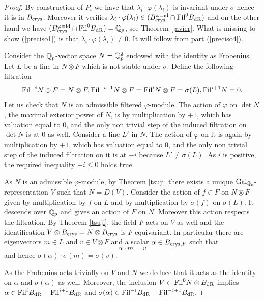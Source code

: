 \documentclass[11pt]{amsart}
\begin{document}
\begin{proof}
By construction of $P_i$ we have that $\lambda_i \cdot\varphi(\lambda_i) $ is invariant under $\sigma$ hence it is in $B_{\textnormal{crys}}$. Moreover it verifies  $ \lambda_i \cdot\varphi(\lambda_i) \in (B_{\textnormal{crys}}^{\varphi=\mathrm{id}} \cap \textnormal{Fil}^0B_{\mathrm{dR}})$  and on the other hand we have  $(B_{\textnormal{crys}}^{\varphi=\mathrm{id}} \cap \textnormal{Fil}^0B_{\mathrm{dR}})=\mathbb{Q}_p$, see Theorem \ref{javier}. What is missing to show (\ref{preciso1}) is that $\lambda_i \cdot\varphi(\lambda_i)\neq 0.$ It will follow from part (\ref{preciso4}).

 Consider the $\mathbb{Q}_p$-vector space $N=\mathbb{Q}_p^2$ endowed with the identity as Frobenius. Let $L$ be a line in $N\otimes F$ which is not stable under $\sigma$.
Define the following filtration
\[\textnormal{Fil}^{-i}N\otimes F=N\otimes F, \textnormal{Fil}^{-i+1}N\otimes F =\textnormal{Fil}^i N \otimes F=\sigma(L), \textnormal{Fil}^{i+1} N=0.  \]
Let us  check that $N$ is an admissible filtered $\varphi$-module.  The action of $\varphi$ on $\det N$, the maximal exterior power of $N$, is by multiplication by $+1$, which has valuation equal to $0$, and the only non trivial step of the induced filtration on $\det N$ is at $0$ as well. Consider a line $L'$ in $N$. The action of $\varphi$ on it is again by multiplication by $+ 1$, which has valuation equal to $0$, and the only non trivial step of the induced filtration on it is at $-i$ because $L'\neq \sigma(L)$. As $i$ is  positive, the required inequality  $-i \leq 0$ holds true.
 
 As $N$ is an admissible $\varphi$-module, by Theorem \ref{tsuji} there exists a unique $\textnormal{Gal}_{\mathbb{Q}_p}$-representation $V$ such that $N=D(V)$. Consider the action of $f\in F$ on $N\otimes F$ given by multiplication by $f$ on $L$ and by multiplication by $\sigma(f)$ on $ \sigma(L)$. It descends over $\mathbb{Q}_p$ and gives an action of $F$ on $N$. Moreover this action respects the filtration. By  Theorem \ref{tsuji}, the field $F$ acts on $V$ as well and  the identification $V \otimes B_{\textnormal{crys}}= N \otimes B_{\textnormal{crys}}$ is $F$-equivariant. In particular there are eigenvectors 
 $m\in L$ and  $v \in V \otimes F$ and a scalar $\alpha \in B_{\textnormal{crys},F}$ such that 
  \[
\alpha \cdot m=   v
 \]
 and hence $ \sigma(\alpha) \cdot \sigma(m)=   \sigma(v)$.
 
As the Frobenius acts trivially on $V$ and $N$ we deduce that it acts as the identity on  $\alpha$ and $\sigma(\alpha)$ as well. 
Moreover,  the inclusion $V \subset \textnormal{Fil}^0 N\otimes B_{\mathrm{dR}}$ implies $\alpha \in \textnormal{Fil} ^i B_{\mathrm{dR}}-\textnormal{Fil} ^{i+1} B_{\mathrm{dR}}$ and $\sigma(\alpha) \in \textnormal{Fil} ^{-i} B_{\mathrm{dR}}-\textnormal{Fil} ^{-i+1} B_{\mathrm{dR}}.$ 


\end{proof}
\end{document}
